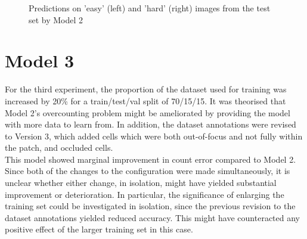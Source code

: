 \begin{figure}
\caption{Predictions on 'easy' (left) and 'hard' (right) images from the test set by Model 2}
\label{model2}
\end{figure}

\section{Model 3}
For the third experiment, the proportion of the dataset used for training was increased by 20\% for a train/test/val split of 70/15/15. It was theorised that Model 2's overcounting problem might be ameliorated by providing the model with more data to learn from. In addition, the dataset annotations were revised to Version 3, which added cells which were both out-of-focus and not fully within the patch, and occluded cells.\\

This model showed marginal improvement in count error compared to Model 2. Since both of the changes to the configuration were made simultaneously, it is unclear whether either change, in isolation, might have yielded substantial improvement or deterioration. In particular, the significance of enlarging the training set could be investigated in isolation, since the previous revision to the dataset annotations yielded reduced accuracy. This might have counteracted any positive effect of the larger training set in this case.

